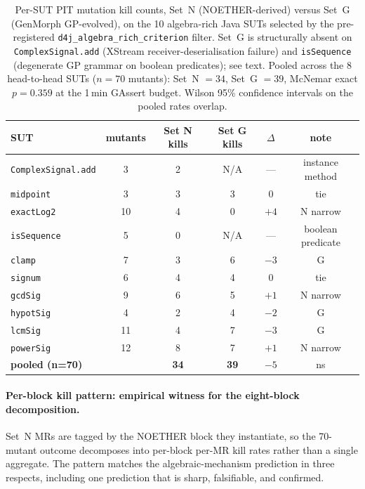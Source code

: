 \begin{table}[h]
\centering
\caption{Per-SUT PIT mutation kill counts, Set~N (NOETHER-derived)
versus Set~G (GenMorph GP-evolved), on the 10 algebra-rich Java SUTs
selected by the pre-registered \texttt{d4j\_algebra\_rich\_criterion}
filter. Set~G is structurally absent on \texttt{ComplexSignal.add}
(XStream receiver-deserialisation failure) and \texttt{isSequence}
(degenerate GP grammar on boolean predicates); see text. Pooled across
the 8 head-to-head SUTs ($n = 70$ mutants): Set~N $= 34$,
Set~G $= 39$, McNemar exact $p = 0.359$ at the 1\,min GAssert budget.
Wilson 95\% confidence intervals on the pooled rates overlap.}
\label{tab:d4j-algebra-rich-pooled}
\small
\begin{tabular}{lccccc}
\toprule
SUT & mutants & Set N kills & Set G kills & $\Delta$ & note \\
\midrule
\texttt{ComplexSignal.add} &  3 & 2 & N/A & --- & instance method \\
\texttt{midpoint}          &  3 & 3 &   3 & $0$  & tie \\
\texttt{exactLog2}         & 10 & 4 &   0 & $+4$ & N narrow \\
\texttt{isSequence}        &  5 & 0 & N/A & --- & boolean predicate \\
\texttt{clamp}             &  7 & 3 &   6 & $-3$ & G \\
\texttt{signum}            &  6 & 4 &   4 & $0$  & tie \\
\texttt{gcdSig}            &  9 & 6 &   5 & $+1$ & N narrow \\
\texttt{hypotSig}          &  4 & 2 &   4 & $-2$ & G \\
\texttt{lcmSig}            & 11 & 4 &   7 & $-3$ & G \\
\texttt{powerSig}          & 12 & 8 &   7 & $+1$ & N narrow \\
\midrule
\textbf{pooled (n=70)}     &    & \textbf{34} & \textbf{39} & $-5$ & ns \\
\bottomrule
\end{tabular}
\end{table}

\paragraph{Per-block kill pattern: empirical witness for the eight-block decomposition.}
Set~N MRs are tagged by the NOETHER block they instantiate, so the
70-mutant outcome decomposes into per-block per-MR kill rates rather
than a single aggregate. The pattern matches the algebraic-mechanism
prediction in three respects, including one prediction that is sharp,
falsifiable, and confirmed.


